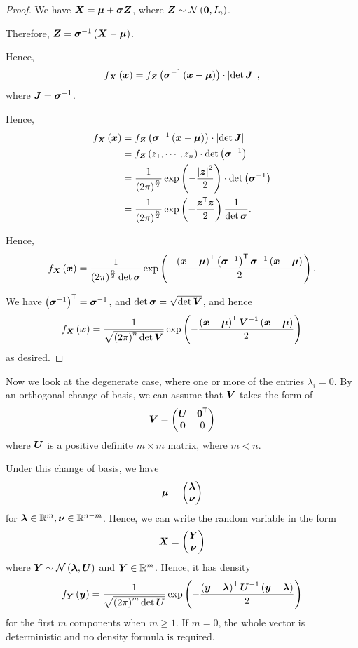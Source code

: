 \documentclass[11pt]{article}
\numberwithin{equation}{section}
\theoremstyle{definition}
\theoremstyle{remark}
\newcommand{\pqty}[1]{\left(#1\right)}
\newcommand{\abs}[1]{\left|#1\right|}
\newcommand{\flatfrac}[2]{\frac{#1}{#2}}
\newcommand{\RR}{\mathbb R}
\newcommand{\inverse}{^{-1}}
\newcommand{\transpose}{^{\mathsf T}}
\newcommand{\identityM}{I}
\newcommand{\zeroM}{0}
\newcommand{\Normal}{\mathcal N}
\newcommand{\pmqty}[1]{\begin{pmatrix}#1\end{pmatrix}}
\begin{document}
\begin{proof}\label{probability-proof-084}
    We have \(\vb{X} = \vb*{\mu} + \vb*{\sigma} \vb{Z}\), where \(\vb{Z} \sim \Normal\pqty{\vb{0}, \identityM_n}\).

    Therefore, \(\vb{Z} = \vb*{\sigma}\inverse \pqty{\vb{X} - \vb*{\mu}}\).

    Hence,
    \[
        f_{\vb{X}} \pqty{\vb{x}} = f_{\vb{Z}} \pqty{\vb*{\sigma}\inverse \pqty{\vb{x} - \vb*{\mu}}} \cdot \abs{\det \vb{J}},
    \]
    where \(\vb{J} = \vb*{\sigma}\inverse\).

    Hence,
    \begin{align*}
        f_{\vb{X}} \pqty{\vb{x}} &= f_{\vb{Z}} \pqty{\vb*{\sigma}\inverse \pqty{\vb{x} - \vb*{\mu}}} \cdot \abs{\det \vb{J}} \\
        &= f_{\vb{Z}} \pqty{z_1, \cdots, z_n} \cdot \det\pqty{\vb*{\sigma} \inverse} \\
        &= \frac{1}{\pqty{2 \pi}^{\flatfrac{n}{2}}} \exp\pqty{- \frac{\abs{\vb{z}}^2}{2}} \cdot \det\pqty{\vb*{\sigma}\inverse} \\
        &= \frac{1}{\pqty{2 \pi}^{\flatfrac{n}{2}}} \exp\pqty{- \frac{\vb{z}\transpose \vb{z}}{2}} \frac{1}{\det \vb*{\sigma}}.
    \end{align*}

    Hence,
    \[
        f_{\vb{X}}\pqty{\vb{x}} = \frac{1}{\pqty{2 \pi}^{\flatfrac{n}{2}} \det \vb*{\sigma}} \exp\pqty{- \frac{\pqty{\vb{x} - \vb*{\mu}}\transpose \pqty{\vb*{\sigma}\inverse}\transpose \vb*{\sigma}\inverse \pqty{\vb{x} - \vb*{\mu}}}{2}}.
    \]

    We have \(\pqty{\vb*{\sigma}\inverse}\transpose = \vb*{\sigma}\inverse\), and \(\det\vb*{\sigma} = \sqrt{\det \vb{V}}\), and hence
    \[
        f_{\vb{X}}\pqty{\vb{x}} = \frac{1}{\sqrt{\pqty{2\pi}^n \det \vb{V}}} \exp\pqty{- \frac{\pqty{\vb{x} - \vb*{\mu}}\transpose \vb{V}\inverse \pqty{\vb{x} - \vb*{\mu}}}{2}}
    \]
    as desired.
\end{proof}

Now we look at the degenerate case, where one or more of the entries \(\lambda_i = 0\). By an orthogonal change of basis, we can assume that \(\vb{V}\) takes the form of
\[
    \vb{V} = \pmqty{
        \vb{U} & \vb{0}\transpose \\ \vb{0} & \zeroM
    }
\]
where \(\vb{U}\) is a positive definite \(m \times m\) matrix, where \(m < n\).

Under this change of basis, we have
\[
    \vb*{\mu} = \pmqty{\vb*{\lambda} \\ \vb*{\nu}}
\]
for \(\vb*{\lambda} \in \RR^m, \vb*{\nu} \in \RR^{n - m}\). Hence, we can write the random variable in the form
\[
    \vb{X} = \pmqty{\vb{Y} \\ \vb*{\nu}}
\]
where \(\vb{Y} \sim \Normal\pqty{\vb*{\lambda}, \vb{U}}\) and \(\vb{Y} \in \RR^m\). Hence, it has density
\[
    f_{\vb{Y}} \pqty{\vb{y}} = \frac{1}{\sqrt{\pqty{2 \pi}^m \det \vb{U}}} \exp \pqty{- \frac{\pqty{\vb{y} - \vb*{\lambda}}\transpose \vb{U}\inverse \pqty{\vb{y} - \vb*{\lambda}}}{2}}
\]
for the first \(m\) components when \(m\ge1\). If \(m=0\), the whole vector is deterministic and no density formula is required.
\end{document}
